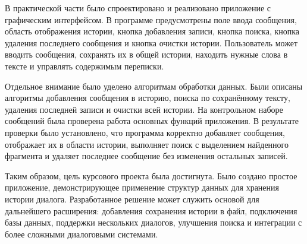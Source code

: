 \documentclass[12pt,a4paper]{article}
\begin{document}
В практической части было спроектировано и реализовано приложение с графическим интерфейсом. В программе предусмотрены поле ввода сообщения, область отображения истории, кнопка добавления записи, кнопка поиска, кнопка удаления последнего сообщения и кнопка очистки истории. Пользователь может вводить сообщения, сохранять их в общей истории, находить нужные слова в тексте и управлять содержимым переписки.

Отдельное внимание было уделено алгоритмам обработки данных. Были описаны алгоритмы добавления сообщения в историю, поиска по сохранённому тексту, удаления последней записи и очистки всей истории. На контрольном наборе сообщений была проверена работа основных функций приложения. В результате проверки было установлено, что программа корректно добавляет сообщения, отображает их в области истории, выполняет поиск с выделением найденного фрагмента и удаляет последнее сообщение без изменения остальных записей.

Таким образом, цель курсового проекта была достигнута. Было создано простое приложение, демонстрирующее применение структур данных для хранения истории диалога. Разработанное решение может служить основой для дальнейшего расширения: добавления сохранения истории в файл, подключения базы данных, поддержки нескольких диалогов, улучшения поиска и интеграции с более сложными диалоговыми системами.
\end{document}
